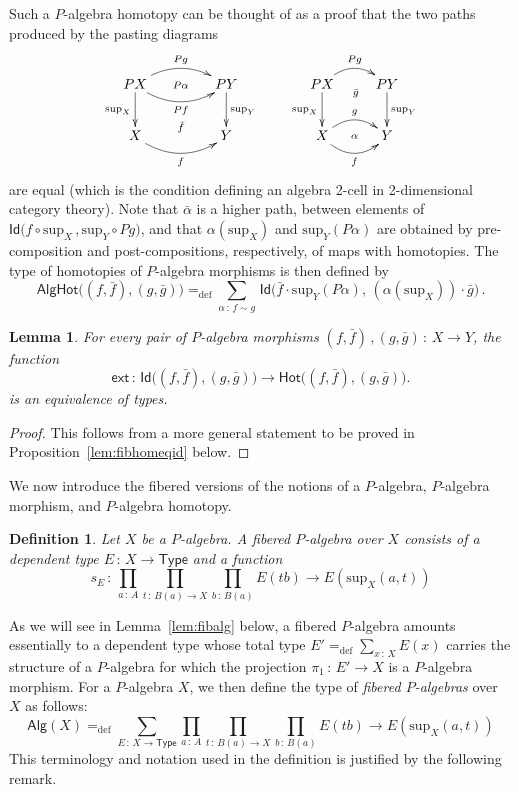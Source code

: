 \documentclass[10pt,a4paper,oneside,reqno]{amsart}
\theoremstyle{mythm}
\newtheorem{lemma}[theorem]{Lemma}
\theoremstyle{mydef}
\newtheorem{definition}[theorem]{Definition}
\theoremstyle{myrmk}
\newcommand{\defeq}{=_{\mathrm{def}}}
\newcommand{\co}{\,{:}\,}
\newcommand{\Hot}{\mathsf{Hot}}
\newcommand{\ext}{\mathsf{ext}}
\newcommand{\Id}{\mathsf{Id}}
\newcommand{\U}{\mathsf{Type}}
\newcommand{\Palg}{\mathsf{Alg}}
\renewcommand{\sup}{\mathrm{sup}}
\newcommand{\AlgHot}{\mathsf{AlgHot}}
\begin{document}
Such a $P$-algebra homotopy can be thought of as a proof that the two paths produced by the pasting diagrams
\[
\xymatrix@C=1.5cm{
PX \ar@/^1pc/[r]^{Pg}   \ar[d]_{\sup_X}   \ar@/_1pc/[r]_{Pf} \ar@{}[r]|{P\alpha}
& PY \ar[d]^{\sup_Y}  \\
X  \ar@/_1pc/[r]_f  \ar@{}[r]^{\bar{f}} & Y }
\qquad
\xymatrix{
PX \ar@/^1pc/[r]^{Pg}   \ar[d]_{\sup_X} \ar@{}[r]_(.52){\bar{g}}  & PY \ar[d]^{\sup_Y}  \\
X \ar@/^1pc/[r]^g  \ar@/_1pc/[r]_f  \ar@{}[r]|{\alpha} & Y }
\]
are equal (which is the condition defining an algebra 2-cell in 2-dimensional category theory). Note that $\bar{\alpha}$ is a higher path, between elements of 
$\Id \big( f \circ \sup_X \, ,  \sup_Y \circ Pg \big)$, and that $\alpha(\sup_X)$ and $\sup_Y(P \alpha)$ are obtained by pre-composition and post-compositions, respectively, of maps with homotopies.  The type of homotopies of $P$-algebra morphisms is then defined by
\[
\AlgHot \big( (f,\bar{f}), (g, \bar{g})  \big)
 \defeq  
\sum_{\alpha \co  f \sim g} \, \Id\big( \bar{f} \cdot \sup_Y(P \alpha),\, (\alpha(\sup_X))\cdot \bar{g} \big) \, .
\]




\begin{lemma}\label{IdEqHo}
For every pair of $P$-algebra morphisms $(f, \bar{f}) \, , (g, \bar{g}) \co X \to Y$,  
the function
\[
\ext \co 
\Id\big((f, \bar{f}), (g, \bar{g})\big) \to \Hot \big((f, \bar{f}), (g, \bar{g})\big).
\]
 is an equivalence of types. 
\end{lemma}

\begin{proof}
This follows from a more general statement to be proved in Proposition~\ref{lem:fibhomeqid} below.
\end{proof}


We now introduce the fibered versions of the notions of a $P$-algebra, $P$-algebra morphism, and $P$-algebra homotopy.

\begin{definition} \label{def:fibalg}
Let $X$ be a $P$-algebra. A \emph{fibered $P$-algebra} over $X$ consists of a dependent type $E \co X \to \U$
and a function 
\[
s_E \co \prod_{a \co A} \prod_{t \co B(a) \to X}  \prod_{b \co B(a)}  E(t b)  \to E(\sup_X(a,t))
 \] 
\end{definition}


As we will see in Lemma~\ref{lem:fibalg} below, a fibered $P$-algebra amounts essentially to a dependent type whose total
type $E' \defeq \sum_{x \co X} E(x)$ carries the structure of a $P$-algebra for which the projection $\pi_1 \co E' 
\to X$ is a $P$-algebra morphism.  For a $P$-algebra $X$, we then define the type of \emph{fibered $P$-algebras} over $X$ as follows:
\[
\Palg(X) \defeq \sum_{E \co X \to \U} \prod_{a \co A} \prod_{t \co B(a) \to X} 
 \prod_{b \co B(a)}  E(t b)  \to E(\sup_X(a,t))
 \]
This terminology and notation used in the definition is justified by the following remark.
\end{document}
